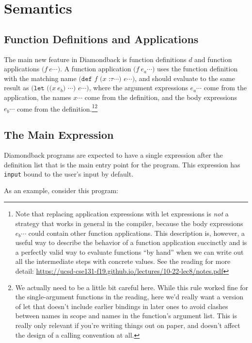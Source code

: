 \documentclass[10pt, oneside]{article}
\begin{document}
\section*{Semantics}

\subsection*{Function Definitions and Applications}

The main new feature in Diamondback is function definitions $d$ and function
applications $\texttt{($f\ e\cdots$)}$. A function application $\texttt{($f\
e_a\cdots$)}$ uses the function definition with the matching name
$\texttt{(def $f$ ($x$ :$\tau \cdots$) $e \cdots$)}$, and should evaluate to
the same result as $\texttt{(let (($x\ e_b$) $\cdots$) $e \cdots$)}$, where
the argument expressions $e_a\cdots$ come from the application, the names
$x\cdots$ come from the definition, and the body expressions $e_b\cdots$ come
from the definition.\footnote{Note that replacing application expressions
with let expressions is \emph{not} a strategy that works in general in the
compiler, because the body expressions $e_b\cdots$ could contain other
function applications. This description is, however, a useful way to describe
the behavior of a function application succinctly and is a perfectly valid
way to evaluate functions ``by hand'' when we can write out all the
intermediate steps with concrete values. See the reading for more detail:
\url{https://ucsd-cse131-f19.github.io/lectures/10-22-lec8/notes.pdf}}\footnote{We
actually need to be a little bit careful here. While this rule worked fine
for the single-argument functions in the reading, here we'd really want a
version of let that doesn't include earlier bindings in later ones to avoid
clashes between names in scope and names in the function's argument list.
This is really only relevant if you're writing things out on paper, and
doesn't affect the design of a calling convention at all.}

\subsection*{The Main Expression}

Diamondback programs are expected to have a single expression after the
definition list that is the main entry point for the program. This expression
has {\tt input} bound to the user's input by default.

As an example, consider this program:
\end{document}
